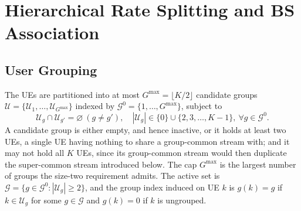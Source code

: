 \section{Hierarchical Rate Splitting and BS Association} \label{sec:hrs}
\subsection{User Grouping}
The UEs are partitioned into at most $G^{\max} = \lfloor K/2 \rfloor$ candidate groups $\mathcal{U} = \{\mathcal{U}_1, \ldots, \mathcal{U}_{G^{\max}}\}$ indexed by $\mathcal{G}^0 = \{1, \ldots, G^{\max}\}$, subject to
\begin{equation} \label{eq:c-group}
\mathcal{U}_g \cap \mathcal{U}_{g'} = \varnothing\ (g \ne g'), \quad |\mathcal{U}_g| \in \{0\} \cup \{2, 3, \ldots, K-1\}, \ \forall g \in \mathcal{G}^0.
\end{equation}
A candidate group is either empty, and hence inactive, or it holds at least two UEs, a single UE having nothing to share a group-common stream with; and it may not hold all $K$ UEs, since its group-common stream would then duplicate the super-common stream introduced below. The cap $G^{\max}$ is the largest number of groups the size-two requirement admits. The active set is $\mathcal{G} = \{g \in \mathcal{G}^0 : |\mathcal{U}_g| \ge 2\}$, and the group index induced on UE $k$ is $g(k) = g$ if $k \in \mathcal{U}_g$ for some $g \in \mathcal{G}$ and $g(k) = 0$ if $k$ is ungrouped.

